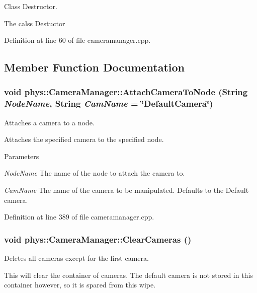 Class Destructor. 

The calss Destuctor 

Definition at line 60 of file cameramanager.cpp.



\subsection{Member Function Documentation}
\hypertarget{classphys_1_1CameraManager_a1cde365b6cab80a33ddf7046489f7af9}{
\subsubsection[{AttachCameraToNode}]{\setlength{\rightskip}{0pt plus 5cm}void phys::CameraManager::AttachCameraToNode ({\bf String} {\em NodeName}, \/  {\bf String} {\em CamName} = {\ttfamily \char`\"{}DefaultCamera\char`\"{}})}}
\label{d9/d91/classphys_1_1CameraManager_a1cde365b6cab80a33ddf7046489f7af9}


Attaches a camera to a node. 

Attaches the specified camera to the specified node. 
\begin{DoxyParams}{Parameters}
\item[{\em NodeName}]The name of the node to attach the camera to. \item[{\em CamName}]The name of the camera to be manipulated. Defaults to the Default camera. \end{DoxyParams}


Definition at line 389 of file cameramanager.cpp.

\hypertarget{classphys_1_1CameraManager_a76bebee0820fcfa462412cb112b1b874}{
\subsubsection[{ClearCameras}]{\setlength{\rightskip}{0pt plus 5cm}void phys::CameraManager::ClearCameras ()}}
\label{d9/d91/classphys_1_1CameraManager_a76bebee0820fcfa462412cb112b1b874}


Deletes all cameras except for the first camera. 

This will clear the container of cameras. The default camera is not stored in this container however, so it is spared from this wipe. 

